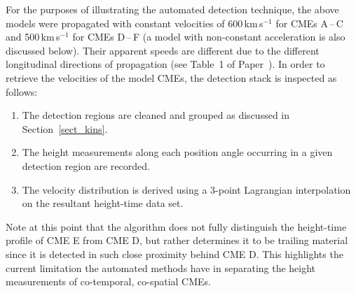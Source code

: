 \documentclass[preprint2]{aastex}
\newcommand{\RNum}[1]{\uppercase\expandafter{\romannumeral #1\relax}}
\begin{document}
For the purposes of illustrating the automated detection technique, the above models were propagated with constant velocities of 600\,km\,s$^{-1}$ for CMEs A\,--\,C and 500\,km\,s$^{-1}$ for CMEs D\,--\,F (a model with non-constant acceleration is also discussed below). Their apparent speeds are different due to the different longitudinal directions of propagation (see Table~1 of Paper~\RNum{1}). In order to retrieve the velocities of the model CMEs, the detection stack is inspected as follows:
\begin{enumerate}
\item The detection regions are cleaned and grouped as discussed in Section~\ref{sect_kins}.
\item The height measurements along each position angle occurring in a given detection region are recorded.
\item The velocity distribution is derived using a 3-point Lagrangian interpolation on the resultant height-time data set.
\end{enumerate}
Note at this point that the algorithm does not fully distinguish the height-time profile of CME E from CME D, but rather determines it to be trailing material since it is detected in such close proximity behind CME D. This highlights the current limitation the automated methods have in separating the height measurements of co-temporal, co-spatial CMEs.
\end{document}
